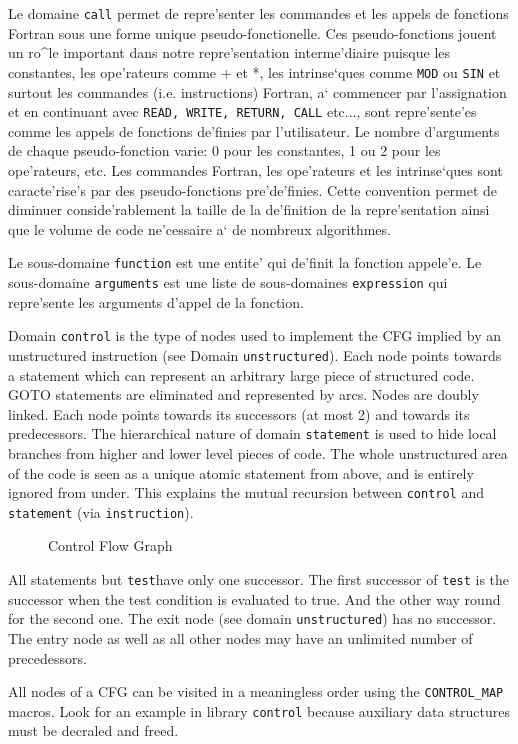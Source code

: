 {

Le domaine \verb/call/ permet de repre'senter les commandes et les
appels de fonctions Fortran sous une forme unique pseudo-fonctionelle.
Ces pseudo-fonctions jouent un ro^le important dans notre
repre'sentation interme'diaire puisque les constantes, les ope'rateurs
comme + et *, les intrinse`ques comme {\tt MOD} ou {\tt SIN} et surtout
les commandes (i.e. instructions) Fortran, a` commencer par
l'assignation et en continuant avec {\tt READ, WRITE, RETURN, CALL}
etc..., sont repre'sente'es comme les appels de fonctions de'finies par
l'utilisateur. Le nombre d'arguments de chaque pseudo-fonction varie: 0
pour les constantes, 1 ou 2 pour les ope'rateurs, etc. Les commandes
Fortran, les ope'rateurs et les intrinse`ques sont caracte'rise's par
des pseudo-fonctions pre'de'finies. Cette convention permet de diminuer
conside'rablement la taille de la de'finition de la repre'sentation
ainsi que le volume de code ne'cessaire a` de nombreux algorithmes.

Le sous-domaine \verb/function/ est une entite' qui de'finit la fonction
appele'e. Le sous-domaine \verb/arguments/ est une liste de sous-domaines
\verb/expression/ qui repre'sente les arguments d'appel de la fonction.
}

{ 

Domain \verb/control/ is the type of nodes used to implement the CFG
implied by an unstructured instruction (see Domain
\verb/unstructured/). Each node points towards a statement which can
represent an arbitrary large piece of structured code. GOTO statements
are eliminated and represented by arcs. Nodes are doubly linked. Each
node points towards its successors (at most 2) and towards its
predecessors. The hierarchical nature of
domain \verb/statement/ is used to hide local branches from higher and
lower level pieces of code. The whole unstructured area of the code is
seen as a unique atomic statement from above, and is entirely ignored
from under. This explains the mutual recursion between \verb/control/
and \verb/statement/ (via \verb/instruction/).

\begin{figure}
\begin{center}
\mbox{}
\end{center}
\caption{Control Flow Graph}
\label{figure-unstructured}
\end{figure}

All statements but \verb/test/have only one successor. The first
successor of \verb/test/ is the successor when the test condition is
evaluated to true.  And the other way round for the second one. The exit
node (see domain \verb/unstructured/) has no successor. The entry node
as well as all other nodes may have an unlimited number of precedessors.

All nodes of a CFG can be visited in a meaningless order using the
\verb/CONTROL_MAP/ macros. Look for an example in library \verb/control/
because auxiliary data structures must be decraled and freed.

}

